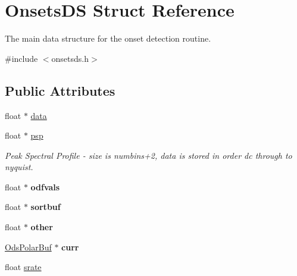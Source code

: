 \hypertarget{structOnsetsDS}{\section{\-Onsets\-D\-S \-Struct \-Reference}
\label{structOnsetsDS}
}


\-The main data structure for the onset detection routine.  




{\ttfamily \#include $<$onsetsds.\-h$>$}

\subsection*{\-Public \-Attributes}
\begin{DoxyCompactItemize}
\item 
float $\ast$ \hyperlink{structOnsetsDS_aba9357b81e5bbaf2f5eec0b5cd6341f2}{data}
\item 
\hypertarget{structOnsetsDS_a7a040fc1d6ef6908f887a102ad628785}{float $\ast$ \hyperlink{structOnsetsDS_a7a040fc1d6ef6908f887a102ad628785}{psp}}\label{structOnsetsDS_a7a040fc1d6ef6908f887a102ad628785}

\begin{DoxyCompactList}\small\item\em \-Peak \-Spectral \-Profile -\/ size is numbins+2, data is stored in order dc through to nyquist. \end{DoxyCompactList}\item 
\hypertarget{structOnsetsDS_a1c971622bde640c9139502da9e68fde4}{float $\ast$ {\bfseries odfvals}}\label{structOnsetsDS_a1c971622bde640c9139502da9e68fde4}

\item 
\hypertarget{structOnsetsDS_aeddae4d94ea3637b33354ccba130bac2}{float $\ast$ {\bfseries sortbuf}}\label{structOnsetsDS_aeddae4d94ea3637b33354ccba130bac2}

\item 
\hypertarget{structOnsetsDS_afe1ac11c0c8bbc98f996ef1d2c6dd441}{float $\ast$ {\bfseries other}}\label{structOnsetsDS_afe1ac11c0c8bbc98f996ef1d2c6dd441}

\item 
\hypertarget{structOnsetsDS_aba2a1f38cab17582cb6745f33643415e}{\hyperlink{structOdsPolarBuf}{\-Ods\-Polar\-Buf} $\ast$ {\bfseries curr}}\label{structOnsetsDS_aba2a1f38cab17582cb6745f33643415e}

\item 
\hypertarget{structOnsetsDS_ae4289889fff68fa8abddd17a6d82d203}{float \hyperlink{structOnsetsDS_ae4289889fff68fa8abddd17a6d82d203}{srate}}\label{structOnsetsDS_ae4289889fff68fa8abddd17a6d82d203}


\end{DoxyCompactItemize}
